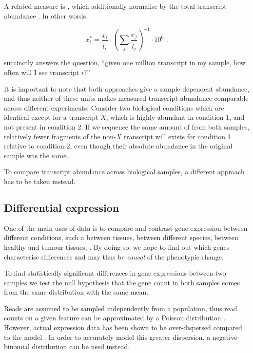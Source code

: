 A related measure is \tpm, which additionally normalise by the total transcript
abundance \citep{Li:2010}. In other words,

\begin{equation}
    x^*_i = \frac{x_i}{\tilde l_i} \cdot \left(\sum_j{\frac{x_j}{\tilde
        l_j}}\right)^{-1} \cdot 10^6 \text{\ .}
\end{equation}

\tpm succinctly answers the question, “given one million transcript in my
sample, how often will I see transcript \(i\)?”

It is important to note that both approaches give a sample dependent abundance,
and thus neither of these units makes measured transcript abundance comparable
across different experiments: Consider two biological conditions which are
identical except for a transcript \(X\), which is highly abundant in condition
\num{1}, and not present in condition \num{2}. If we sequence the same amount of
\mrna from both samples, relatively fewer fragments of the non-\(X\) transcript
will exists for condition \num{1} relative to condition \num{2}, even though
their absolute abundance in the original sample was the same.

To compare transcript abundance across biological samples, a different approach
has to be taken instead.

\subsection{Differential expression}

One of the main uses of \rnaseq data is to compare and contrast gene expression
between different conditions, such a between tissues, between different species,
between healthy and tumour tissues, \etc. By doing so, we hope to find out which
genes characterise differences and may thus be \emph{causal} of the phenotypic
change.

To find statistically significant differences in gene expressions between two
samples we test the null hypothesis that the gene count in both samples comes
from the same distribution with the same mean.

Reads are assumed to be sampled independently from a population, thus read
counts on a given feature can be approximated by a Poisson distribution
\citep{Mortazavi:2008, Marioni:2008}. However, actual expression data has been
shown to be over-dispersed compared to the model \citep{Robinson:2007}. In order
to accurately model this greater dispersion, a negative binomial distribution
can be used instead.

